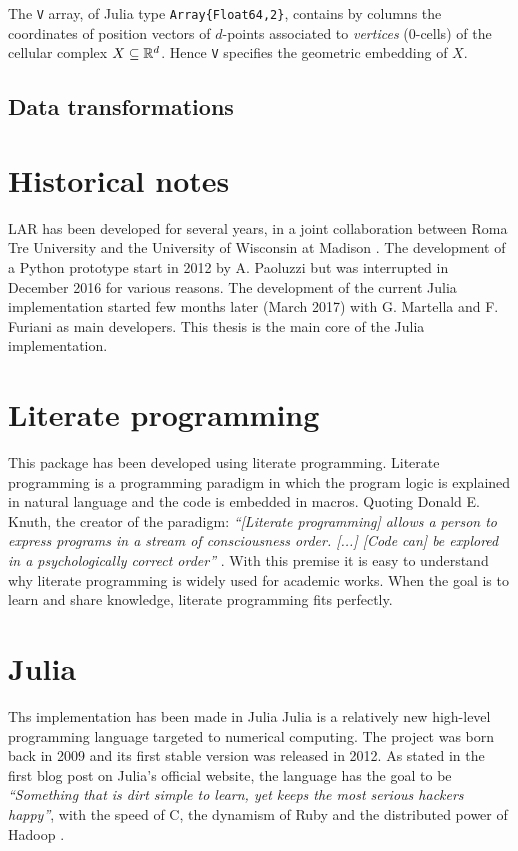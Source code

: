 The \texttt{V} array, of Julia type \texttt{Array\{Float64,2\}}, contains by columns the coordinates of position vectors of $d$-points associated to \emph{vertices} (0-cells) of the cellular complex $X \subseteq \mathbb{R}^d$. Hence \texttt{V} specifies the geometric embedding of $X$.


\subsection{Data transformations}
\label{sec:transformations}



\section{Historical notes}
\label{sec:history}
LAR has been developed for several years, in a joint collaboration 
between Roma Tre University and the University 
of Wisconsin at Madison \cite{ieee-tase}. The development of a Python 
prototype start in 2012 by A. Paoluzzi but was interrupted 
in December 2016 for various reasons. The development of the current
Julia implementation started few months later (March 2017) with
G. Martella and F. Furiani as main developers. This thesis is
the main core of the Julia implementation.


\section{Literate programming}
This package has been developed using literate programming.
Literate programming is a programming paradigm in which the program
logic is explained in natural language and the code is embedded in macros.
Quoting Donald E. Knuth, the creator of the paradigm: 
\textit{``[Literate programming] allows a person to express programs in a stream of
consciousness order. [...] [Code can] be explored
in a psychologically correct order''} \cite{knuth}. 
With this premise it is easy to understand why literate programming 
is widely used for academic works.
When the goal is to learn and share knowledge, literate programming fits perfectly.


\section{Julia}

Ths implementation has been made in Julia
Julia is a relatively new high-level programming language targeted 
to numerical computing. The project was born back in 2009 and its first
stable version was released in 2012. As stated in the first blog post
on Julia's official website, the language has the goal
to be \textit{``Something that is dirt simple to learn, 
yet keeps the most serious hackers happy''}, with the speed of C, 
the dynamism of Ruby and the distributed power of Hadoop
\cite{julia}.


